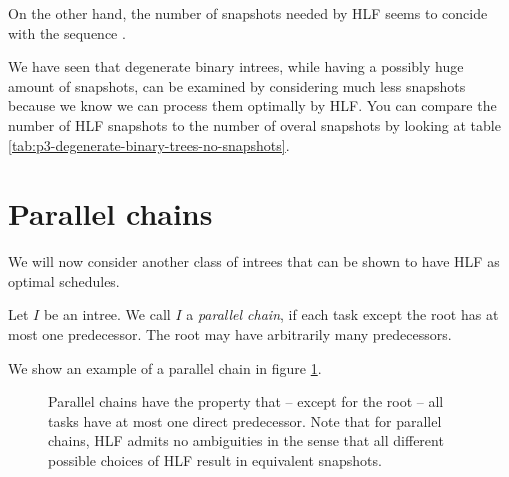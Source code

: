 On the other hand, the number of snapshots needed by HLF seems to concide with the sequence \cite{oeisA055803}.

We have seen that degenerate binary intrees, while having a possibly huge amount of snapshots, can be examined by considering much less snapshots because we know we can process them optimally by HLF. You can compare the number of HLF snapshots to the number of overal snapshots by looking at table \ref{tab:p3-degenerate-binary-trees-no-snapshots}.

\section{Parallel chains}
\label{sec:p3-parallel-chains}

We will now consider another class of intrees that can be shown to have HLF as optimal schedules.

\begin{definition}
  Let $I$ be an intree. We call $I$ a \emph{parallel chain}, if each task except the root has at most one predecessor. The root may have arbitrarily many predecessors.
\end{definition}

We show an example of a parallel chain in figure \ref{fig:parallel-chain-intro-figure}.

\begin{figure}[th]
  \centering
  \caption{Parallel chains have the property that -- except for the root -- all tasks have at most one direct predecessor. Note that for parallel chains, HLF admits no ambiguities in the sense that all different possible choices of HLF result in equivalent snapshots.}
  \label{fig:parallel-chain-intro-figure}
\end{figure}

